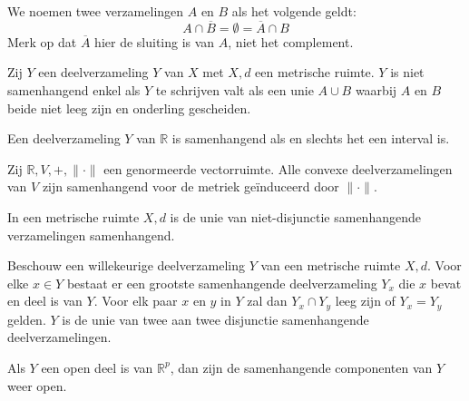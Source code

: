 \documentclass[main.tex]{subfiles}
\begin{document}
\begin{de}
  We noemen twee verzamelingen $A$ en $B$  als het volgende geldt:
  \[ A \cap \overline{B} = \emptyset = \overline{A} \cap B \]
  Merk op dat $\overline{A}$ hier de sluiting is van $A$, niet het complement.
\end{de}

\begin{bpr}
  Zij $Y$ een deelverzameling $Y$ van $X$ met $X,d$ een metrische ruimte.
  $Y$ is niet samenhangend enkel als $Y$ te schrijven valt als een unie $A \cup B$ waarbij $A$ en $B$ beide niet leeg zijn en onderling gescheiden.
\end{bpr}

\begin{bpr}
  Een deelverzameling $Y$ van $\mathbb{R}$ is samenhangend als en slechts het een interval is.
\end{bpr}

\begin{bpr}
  Zij $\mathbb{R},V,+, \|\cdot\|$ een genormeerde vectorruimte.
  Alle convexe deelverzamelingen van $V$ zijn samenhangend voor de metriek ge\"induceerd door $\|\cdot\|$.
\end{bpr}

\begin{bpr}
  In een metrische ruimte $X,d$ is de unie van niet-disjunctie samenhangende verzamelingen samenhangend.
\end{bpr}

\begin{bpr}
  Beschouw een willekeurige deelverzameling $Y$ van een metrische ruimte $X,d$.
  Voor elke $x\in Y$ bestaat er een grootste samenhangende deelverzameling $Y_{x}$ die $x$ bevat en deel is van $Y$.
  Voor elk paar $x$ en $y$ in $Y$ zal dan $Y_{x} \cap Y_{y}$ leeg zijn of $Y_{x} = Y_{y}$ gelden.
  $Y$ is de unie van twee aan twee disjunctie samenhangende deelverzamelingen.
\end{bpr}

\begin{bpr}
 Als $Y$ een open deel is van $\mathbb{R}^{p}$, dan zijn de samenhangende componenten van $Y$ weer open.
\end{bpr}
\end{document}
